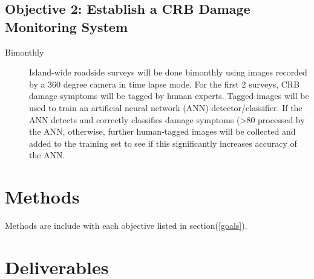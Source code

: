 \documentclass[14pt,english,letterpaper]{scrartcl}
\begin{document}
\subsection{Objective 2: Establish a CRB Damage Monitoring System}

\begin{description}
	\item[Bimonthly] Island-wide roadside surveys will be done bimonthly using images recorded by a 360 degree camera in
time lapse mode. For the first 2 surveys, CRB damage symptoms will be tagged by human experts.
Tagged images will be used to train an artificial neural network (ANN) detector/classifier. If the ANN
detects and correctly classifies damage symptoms (>80%
processed by the ANN, otherwise, further human-tagged images will be collected and added to the
training set to see if this significantly increases accuracy of the ANN.
\end{description}

\section{Methods} 


Methods are include with each objective listed in section(\ref{goals}).

\section{Deliverables} 

\end{document}
